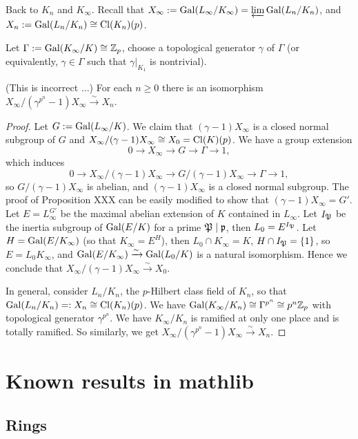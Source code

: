 Back to $K_n$ and $K_\infty$.
Recall that $X_\infty:={\mathrm{Gal}}(L_\infty/K_\infty)=\varprojlim{\mathrm{Gal}}(L_n/K_n)$,
and $X_n:={\mathrm{Gal}}(L_n/K_n)\cong{\mathrm{Cl}}(K_n)(p)$.

Let $\Gamma:={\mathrm{Gal}}(K_\infty/K)\cong{\mathbb {Z}}_p$, choose a topological
generator $\gamma$ of $\Gamma$ (or equivalently, $\gamma\in\Gamma$
such that $\gamma|_{K_1}$ is nontrivial).

\begin{prop}
\label{X-inf-coinv-is-X-n}
(This is incorrect ...)
For each $n\geq 0$ there is an isomorphism
$X_\infty/(\gamma^{p^n}-1)X_\infty\xrightarrow\sim
X_n$.
\end{prop}

\begin{proof}
Let $G:={\mathrm{Gal}}(L_\infty/K)$.
We claim that $(\gamma-1)X_\infty$ is a closed normal subgroup of $G$
and $X_\infty/(\gamma-1)X_\infty\cong X_0={\mathrm{Cl}}(K)(p)$. We have a group extension
$$
0\to X_\infty\to G\to\Gamma\to 1,
$$
which induces
$$
0\to X_\infty/(\gamma-1)X_\infty\to G/(\gamma-1)X_\infty\to\Gamma\to 1,
$$
so $G/(\gamma-1)X_\infty$ is abelian, and $(\gamma-1)X_\infty$
is a closed normal subgroup.
The proof of Proposition XXX can be easily modified to
show that $(\gamma-1)X_\infty=G'$.
Let $E=L_\infty^{G'}$ be the maximal abelian extension
of $K$ contained in $L_\infty$. Let $I_{\mathfrak{P}}$ be the inertia
subgroup of ${\mathrm{Gal}}(E/K)$ for a prime ${\mathfrak{P}}\mid{\mathfrak{p}}$,
then $L_0=E^{I_{\mathfrak{P}}}$. Let $H={\mathrm{Gal}}(E/K_\infty)$
(so that $K_\infty=E^H$), then $L_0\cap K_\infty=K$,
$H\cap I_{\mathfrak{P}}=\{1\}$, so $E=L_0K_\infty$,
and ${\mathrm{Gal}}(E/K_\infty)\xrightarrow\sim{\mathrm{Gal}}(L_0/K)$
is a natural isomorphism.
Hence we conclude that $X_\infty/(\gamma-1)X_\infty\xrightarrow\sim X_0$.

In general, consider $L_n/K_n$, the $p$-Hilbert class field of $K_n$,
so that ${\mathrm{Gal}}(L_n/K_n)=:X_n\cong{\mathrm{Cl}}(K_n)(p)$.
We have ${\mathrm{Gal}}(K_\infty/K_n)\cong\Gamma^{p^n}\cong p^n{\mathbb {Z}}_p$
with topological generator $\gamma^{p^n}$.
We have $K_\infty/K_n$ is ramified at only one place and is
totally ramified. So similarly, we get $X_\infty/(\gamma^{p^n}-1)X_\infty\xrightarrow\sim
X_n$.
\end{proof}
\fi

\appendix

\section{Known results in mathlib}

\subsection{Rings}

